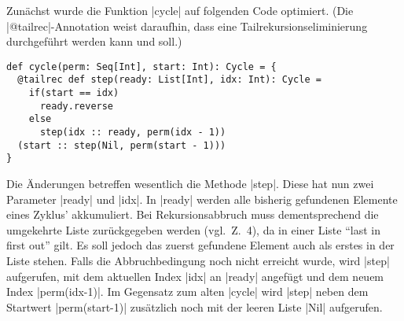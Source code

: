 Zunächst wurde die Funktion |cycle| auf folgenden Code optimiert. (Die |@tailrec|-Annotation weist daraufhin, dass eine Tailrekursionseliminierung durchgeführt werden kann und soll.)
\begin{lstlisting}
def cycle(perm: Seq[Int], start: Int): Cycle = {
  @tailrec def step(ready: List[Int], idx: Int): Cycle =
    if(start == idx)
      ready.reverse
    else
      step(idx :: ready, perm(idx - 1))
  (start :: step(Nil, perm(start - 1)))
}
\end{lstlisting}
Die Änderungen betreffen wesentlich die Methode |step|. Diese hat nun zwei Parameter |ready| und |idx|.
In |ready| werden alle bisherig gefundenen Elemente eines Zyklus' akkumuliert.
Bei Rekursionsabbruch muss dementsprechend die umgekehrte Liste zurückgegeben werden (vgl.\ Z.\ 4), da in einer Liste ``last in first out'' gilt.
Es soll jedoch das zuerst gefundene Element auch als erstes in der Liste stehen.
Falls die Abbruchbedingung noch nicht erreicht wurde, wird |step| aufgerufen, mit dem aktuellen Index |idx| an |ready| angefügt und dem neuem Index |perm(idx-1)|.
Im Gegensatz zum alten |cycle| wird |step| neben dem Startwert |perm(start-1)| zusätzlich noch mit der leeren Liste |Nil| aufgerufen.

